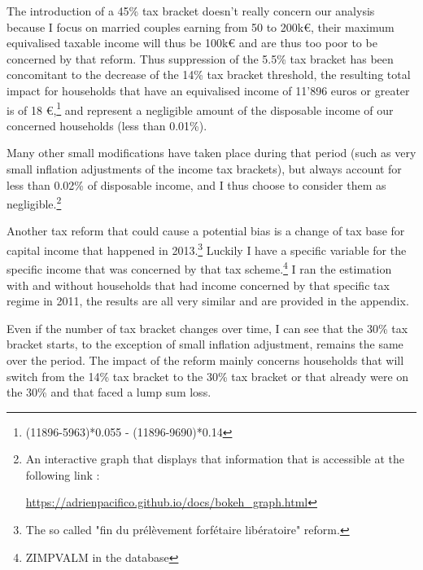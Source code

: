 The introduction of a 45\% tax bracket doesn't really concern our analysis because I focus on married couples earning from 50 to 200k\euro{}, their maximum equivalised taxable income will thus be 100k\euro{} and are thus too poor to be concerned by that reform. Thus suppression of the 5.5\% tax bracket has been concomitant to the decrease of the 14\% tax bracket threshold, the resulting total impact for households that have an equivalised income of 11'896 euros or greater is of 18 \euro{},\footnote{(11896-5963)*0.055 - (11896-9690)*0.14 } and represent a negligible amount of the disposable income of our concerned households (less than 0.01\%).

Many other small modifications have taken place during that period (such as very small inflation adjustments of the income tax brackets), but always account for less than 0.02\% of disposable income, and I thus choose to consider them as negligible.\footnote{ An interactive graph that displays that information that is accessible at the following link : \begin{sloppypar}\url{https://adrienpacifico.github.io/docs/bokeh_graph.html}\end{sloppypar} }

Another tax reform that could cause a potential bias is a change of tax base for capital income that happened in 2013.\footnote{The so called "fin du prélèvement forfétaire libératoire" reform.} Luckily I have a specific variable for the specific income that was concerned by that tax scheme.\footnote{ZIMPVALM in the database}
I ran the estimation with and without households that had income concerned by that specific tax regime in 2011, the results are all very similar and are provided in the appendix. 





Even if the number of tax bracket changes over time, I can see that the 30\% tax bracket starts, to the exception of small inflation adjustment, remains the same over the period. 
  The impact of the reform mainly concerns households that will switch from the 14\% tax bracket to the 30\% tax bracket or that already were on the 30\% and that faced a lump sum loss.

  
  
